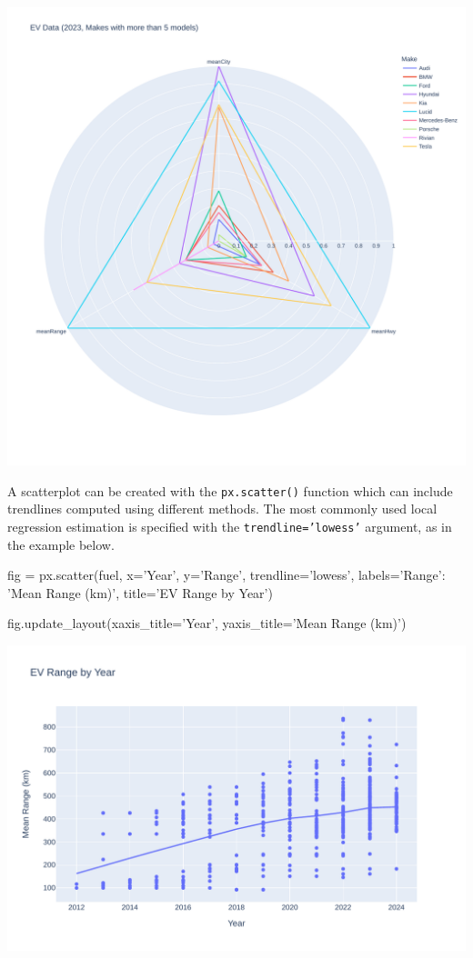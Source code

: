 \begin{center}
  \includegraphics[width=.8\textwidth]{px.fuel.radar.pdf}
\end{center}

A scatterplot can be created with the \texttt{px.scatter()} function which can include trendlines computed using different methods. The most commonly used local regression estimation is specified with the \texttt{trendline='lowess'} argument, as in the example below.

\begin{samepage}
\begin{pythoncode}
fig = px.scatter(fuel, 
    x='Year', y='Range', trendline='lowess',
    labels={'Range': 'Mean Range (km)'},
    title='EV Range by Year')

fig.update_layout(xaxis_title='Year',
                  yaxis_title='Mean Range (km)')
\end{pythoncode}
\end{samepage}

\begin{center}
  \includegraphics[width=\textwidth]{px.fuel.linesSmooth.pdf}
\end{center}

